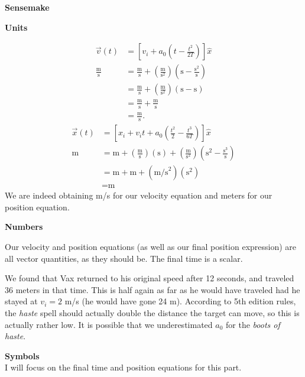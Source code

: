 \documentclass[]{article}
\begin{document}
\begin{TeacherMargin}
\noindent\textbf{Sensemake}

\noindent\textbf{Units}
\begin{multicols}{2}
\noindent
\[
\begin{split}
	\vec{v}(t) & = \left[v_{i} + a_{0}\left(t-\frac{t^{2}}{2T}\right)\right]\hat{x} \\
	\frac{\text{m}}{\text{s}} & = \frac{\text{m}}{\text{s}} + \left(\frac{\text{m}}{\text{s}^{2}}\right)\left(\text{s}-\frac{\text{s}^{2}}{\text{s}}\right) \\
	& = \frac{\text{m}}{\text{s}} + \left(\frac{\text{m}}{\text{s}^{2}}\right)\left(\text{s}-\text{s}\right) \\
	& = \frac{\text{m}}{\text{s}} + \frac{\text{m}}{\text{s}} \\
	& = \frac{\text{m}}{\text{s}}.
\end{split}
\]
\[
\begin{split}
	\vec{x}(t) & = \left[x_{i} + v_{i}t + a_{0}\left(\frac{t^{2}}{2}-\frac{t^{3}}{6T}\right)\right]\hat{x} \\
	\text{m} & = \text{m} + \left(\frac{\text{m}}{\text{s}}\right)(\text{s}) + \left(\frac{\text{m}}{\text{s}^{2}}\right)\left(\text{s}^{2}-\frac{\text{s}^{3}}{\text{s}}\right) \\
	& = \text{m} + \text{m} + (\text{m/s}^{2})(\text{s}^{2}) \\
	& = \text{m}
\end{split}
\]
We are indeed obtaining m/s for our velocity equation and meters for our position equation.
\end{multicols}

\noindent\textbf{Numbers}

Our velocity and position equations (as well as our final position expression) are all vector quantities, as they should be. The final time is a scalar.

We found that Vax returned to his original speed after 12 seconds, and traveled 36 meters in that time. This is half again as far as he would have traveled had he stayed at $v_{i}=2$ m/s (he would have gone 24 m). According to 5th edition rules, the \textit{haste} spell should actually double the distance the target can move, so this is actually rather low. It is possible that we underestimated $a_{0}$ for the \textit{boots of haste}.

\noindent\textbf{Symbols} \\
I will focus on the final time and position equations for this part. 


\end{TeacherMargin}
\end{document}

